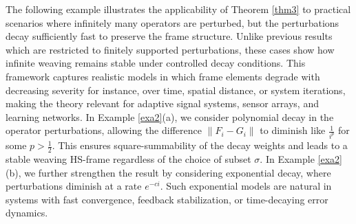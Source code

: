\documentclass[reqno]{amsart}
\theoremstyle{plain}
\theoremstyle{remark}
\numberwithin{equation}{section}
\begin{document}
The following example illustrates the applicability of Theorem \ref{thm3} to practical scenarios where infinitely many operators are perturbed, but the perturbations decay sufficiently fast to preserve the frame structure. Unlike previous results which are restricted to finitely supported perturbations, these cases show how infinite weaving remains stable under controlled decay conditions. This framework captures realistic models in which frame elements degrade with decreasing severity for instance, over time, spatial distance, or system iterations, making the theory relevant for adaptive signal systems, sensor arrays, and learning networks. In Example \ref{exa2}(a), we consider polynomial decay in the operator perturbations, allowing the difference $\|F_i-G_i\|$ to diminish like $\frac{1}{i^p}$ for some $p>\frac{1}{2}$. This ensures square-summability of the decay weights and leads to a stable weaving HS-frame regardless of the choice of subset $\sigma$. In Example \ref{exa2}(b), we further strengthen the result by considering exponential decay, where perturbations diminish at a rate $e^{-ci}$. Such exponential models are natural in systems with fast convergence, feedback stabilization, or time-decaying error dynamics.
\end{document}
